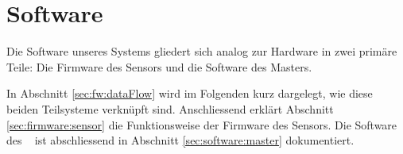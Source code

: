 \chapter{Software}
\label{chap:software}

Die  Software   unseres  Systems   gliedert  sich   analog  zur   Hardware  in
zwei  prim\"are  Teile: Die   Firmware  des  Sensors  und   die  Software  des
Masters.

In  Abschnitt  \ref{sec:fw:dataFlow} wird  im  Folgenden  kurz dargelegt,  wie
diese beiden  Teilsysteme verkn\"upft sind. Anschliessend  erkl\"art Abschnitt
\ref{sec:firmware:sensor}  die Funktionsweise  der  Firmware des  Sensors. Die
Software des \Raspi~ ist  abschliessend in Abschnitt \ref{sec:software:master}
dokumentiert.


